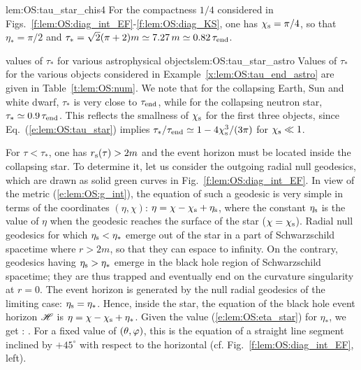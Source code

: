\begin{texample}{}{lem:OS:tau_star_chis4}
For the compactness $1/4$ considered in
Figs.~\ref{f:lem:OS:diag_int_EF}-\ref{f:lem:OS:diag_KS}, one has $\chi_{\rm s}=\pi/4$,
so that $\eta_* = \pi/2$ and
$\tau_* = \sqrt{2}(\pi + 2) m \simeq 7.27 \, m \simeq 0.82 \, \tau_{\rm end}$.
\end{texample}

\begin{texample}{values of $\tau_*$ for various astrophysical objects}{lem:OS:tau_star_astro}
Values of $\tau_*$ for the various objects considered in Example~\ref{x:lem:OS:tau_end_astro}
are given in Table~\ref{t:lem:OS:num}. We note that for the collapsing Earth, Sun and white dwarf,
$\tau_*$ is very close to $\tau_{\rm end}$, while for the collapsing neutron star,
$\tau_* \simeq 0.9 \, \tau_{\rm end}$. This reflects the smallness of $\chi_{\rm s}$ for
the first three objects, since Eq.~(\ref{e:lem:OS:tau_star}) implies
$\tau_*/\tau_{\rm end} \simeq 1 - 4 \chi_{\rm s}^3/(3\pi)$ for $\chi_{\rm s} \ll 1$.
\end{texample}

For $\tau < \tau_*$, one has $r_{\rm s}(\tau) > 2 m$ and the event horizon
must be located inside the collapsing star. To determine it,
let us consider the outgoing radial null geodesics, which are drawn as solid green curves
in Fig.~\ref{f:lem:OS:diag_int_EF}. In view of the metric (\ref{e:lem:OS:g_int}),
the equation of such a geodesic is very simple in terms of
the coordinates $(\eta,\chi)$: $\eta = \chi - \chi_{\rm s} + \eta_{\rm s}$, where
the constant $\eta_{\rm s}$ is the value of $\eta$ when the geodesic
reaches the surface of the star ($\chi = \chi_{\rm s}$). Radial null geodesics
for which $\eta_{\rm s} < \eta_*$ emerge out of the star in
a part of Schwarzschild spacetime where $r > 2 m$, so that they can espace
to infinity. On the contrary, geodesics having $\eta_{\rm s} > \eta_*$ emerge in the
black hole region of Schwarzschild spacetime; they are thus trapped and
eventually end on the curvature singularity at $r=0$. The event horizon
is generated by the null radial geodesics of the limiting case: $\eta_{\rm s} = \eta_*$.
Hence, inside the star, the equation of the black hole event horizon $\mathscr{H}$
is $\eta = \chi - \chi_{\rm s} + \eta_*$. Given the value (\ref{e:lem:OS:eta_star}) for
$\eta_*$, we get
\be \label{e:lem:OS:Hor_eta_chi}
    \Hor:\quad {} .
\ee
For a fixed value of $(\theta,\varphi)$, this is the equation of a straight line segment
inclined by $+45^\circ$ with
respect to the horizontal (cf. Fig.~\ref{f:lem:OS:diag_int_EF}, left).

